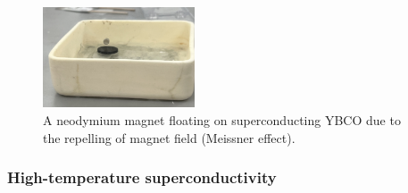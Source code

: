 \begin{figure}
  \centering
  \includegraphics[width=0.4\textwidth]{media/meissner.jpg}
  \caption{A neodymium magnet floating on superconducting YBCO due to the repelling of magnet field
  (Meissner effect).}
  \label{fig:intr:meissner}
\end{figure}

\subsubsection{High-temperature superconductivity}
\label{sec:intr:high-tc}

